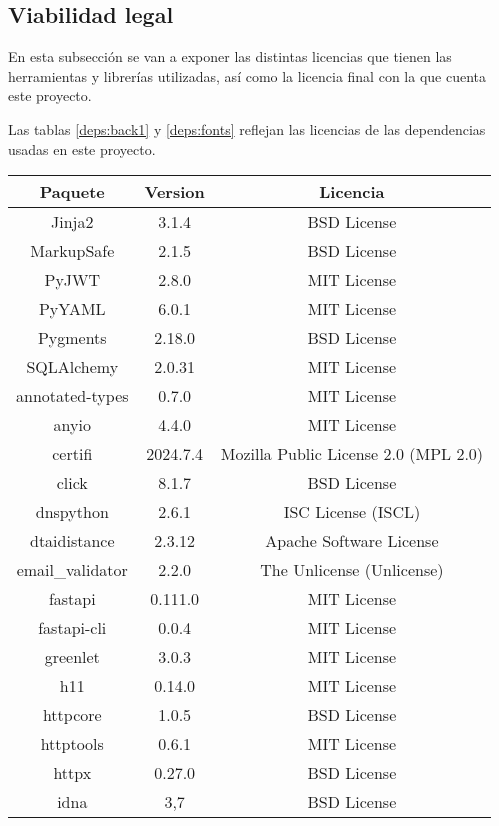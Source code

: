\subsection{Viabilidad legal}
En esta subsección se van a exponer las distintas licencias que tienen las herramientas y librerías utilizadas, así como la licencia final con la que cuenta este proyecto.

Las tablas \ref{deps:back1} y \ref{deps:fonts} reflejan las licencias de las dependencias usadas en este proyecto.


	\begin{longtable}{|c|c|c|}
		\hline
		\textbf{Paquete} & \textbf{Version} & \textbf{Licencia} \\
		\hline
		\endhead
		Jinja2 & 3.1.4 & BSD License \\
		\hline
		MarkupSafe & 2.1.5 & BSD License \\
		\hline
		PyJWT & 2.8.0 & MIT License \\
		\hline
		PyYAML & 6.0.1 & MIT License \\
		\hline
		Pygments & 2.18.0 & BSD License \\
		\hline
		SQLAlchemy & 2.0.31 & MIT License \\
		\hline
		annotated-types & 0.7.0 & MIT License \\
		\hline
		anyio & 4.4.0 & MIT License \\
		\hline
		certifi & 2024.7.4 & Mozilla Public License 2.0 (MPL 2.0) \\
		\hline
		click & 8.1.7 & BSD License \\
		\hline
		dnspython & 2.6.1 & ISC License (ISCL) \\
		\hline
		dtaidistance & 2.3.12 & Apache Software License \\
		\hline
		email\_validator & 2.2.0 & The Unlicense (Unlicense) \\
		\hline
		fastapi & 0.111.0 & MIT License \\
		\hline
		fastapi-cli & 0.0.4 & MIT License \\
		\hline
		greenlet & 3.0.3 & MIT License \\
		\hline
		h11 & 0.14.0 & MIT License \\
		\hline
		httpcore & 1.0.5 & BSD License \\
		\hline
		httptools & 0.6.1 & MIT License \\
		\hline
		httpx & 0.27.0 & BSD License \\
		\hline
		idna & 3,7 & BSD License \\

\end{longtable}
